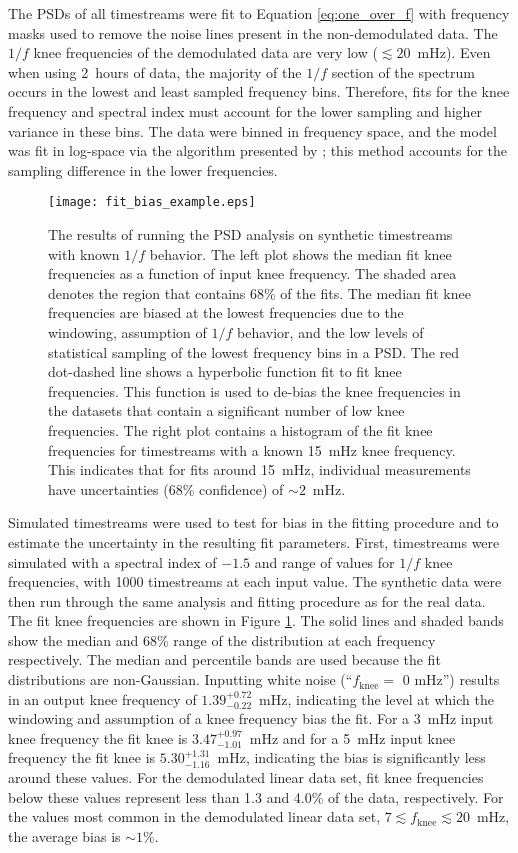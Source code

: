 \documentclass[twocolumn, tighten, numberedappendix, twocolappendix]{aastex63}
\begin{document}
\noindent The PSDs of all timestreams were fit to Equation \ref{eq:one_over_f} with frequency masks used to remove the noise lines present in the non-demodulated data. The $1/f$ knee frequencies of the demodulated data are very low ($\lesssim 20$~mHz). Even when using 2~hours of data, the majority of the $1/f$ section of the spectrum occurs in the lowest and least sampled frequency bins. Therefore, fits for the knee frequency and spectral index must account for the lower sampling and higher variance in these bins. The data were binned in frequency space, and the model was fit in log-space via the algorithm presented by \cite{Papadakis1993}; this method accounts for the sampling difference in the lower frequencies.

\begin{figure}
    \centering
    \texttt{[image: fit\_bias\_example.eps]}
    \caption{The results of running the PSD analysis on synthetic timestreams with known $1/f$ behavior. The left plot shows the median fit knee frequencies as a function of input knee frequency. The shaded area denotes the region that contains 68\% of the fits. The median fit knee frequencies are biased at the lowest frequencies due to the windowing, assumption of $1/f$ behavior, and the low levels of statistical sampling of the lowest frequency bins in a PSD. The red dot-dashed line shows a hyperbolic function fit to fit knee frequencies. This function is used to de-bias the knee frequencies in the datasets that contain a significant number of low knee frequencies. The right plot contains a histogram of the fit knee frequencies for timestreams with a known 15~mHz knee frequency. This indicates that for fits around 15~mHz, individual measurements have uncertainties (68\% confidence) of $\sim 2$~mHz.}
    \label{fig:fit_bias}
\end{figure}

Simulated timestreams were used to test for bias in the fitting procedure and to estimate the uncertainty in the resulting fit parameters.  First, timestreams were simulated with a spectral index of $-1.5$ and range of values for $1/f$ knee frequencies, with 1000 timestreams at each input value. The synthetic data were then run through the same analysis and fitting procedure as for the real data. The fit knee frequencies are shown in Figure \ref{fig:fit_bias}. The solid lines and shaded bands show the median and 68\% range of the distribution at each frequency respectively. The median and percentile bands are used because the fit distributions are non-Gaussian. Inputting white noise (``$f_\mathrm{knee} = $ 0 mHz'') results in an output knee frequency of $1.39^{+0.72}_{-0.22}$~mHz, indicating the level at which the windowing and assumption of a knee frequency bias the fit. For a 3~mHz input knee frequency the fit knee is $3.47_{-1.01}^{+0.97}$~mHz and for a 5~mHz input knee frequency the fit knee is $5.30_{-1.16}^{+1.31}$~mHz, indicating the bias is significantly less around these values. For the demodulated linear data set, fit knee frequencies below these values represent less than 1.3 and 4.0\% of the data, respectively. For the values most common in the demodulated linear data set, $7 \lesssim f_{\mathrm{knee}} \lesssim 20$~mHz, the average bias is $\sim1\%$. 
\end{document}
